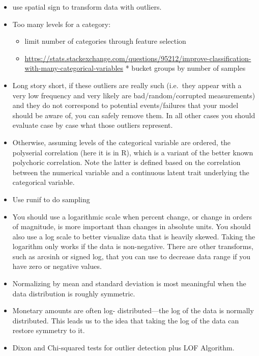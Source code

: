 \documentclass[]{book}
\providecommand{\tightlist}{%
  \setlength{\itemsep}{0pt}\setlength{\parskip}{0pt}}
\theoremstyle{definition}
\theoremstyle{definition}
\theoremstyle{definition}
\theoremstyle{remark}
\begin{document}
\begin{itemize}
\item
  use spatial sign to transform data with outliers.
\item
  Too many levels for a category:

  \begin{itemize}
  \tightlist
  \item
    limit number of categories through feature selection
  \item
    \url{https://stats.stackexchange.com/questions/95212/improve-classification-with-many-categorical-variables}
    * bucket groups by number of samples
  \end{itemize}
\item
  Long story short, if these outliers are really such (i.e.~they appear
  with a very low frequency and very likely are bad/random/corrupted
  measurements) and they do not correspond to potential events/failures
  that your model should be aware of, you can safely remove them. In all
  other cases you should evaluate case by case what those outliers
  represent.
\item
  Otherwise, assuming levels of the categorical variable are ordered,
  the polyserial correlation (here it is in R), which is a variant of
  the better known polychoric correlation. Note the latter is defined
  based on the correlation between the numerical variable and a
  continuous latent trait underlying the categorical variable.
\item
  Use runif to do sampling
\item
  You should use a logarithmic scale when percent change, or change in
  orders of magnitude, is more important than changes in absolute units.
  You should also use a log scale to better visualize data that is
  heavily skewed. Taking the logarithm only works if the data is
  non-negative. There are other transforms, such as arcsinh or signed
  log, that you can use to decrease data range if you have zero or
  negative values.
\item
  Normalizing by mean and standard deviation is most meaningful when the
  data distribution is roughly symmetric.
\item
  Monetary amounts are often log- distributed---the log of the data is
  normally distributed. This leads us to the idea that taking the log of
  the data can restore symmetry to it.
\item
  Dixon and Chi-squared tests for outlier detection plus LOF Algorithm.
\end{itemize}
\end{document}
